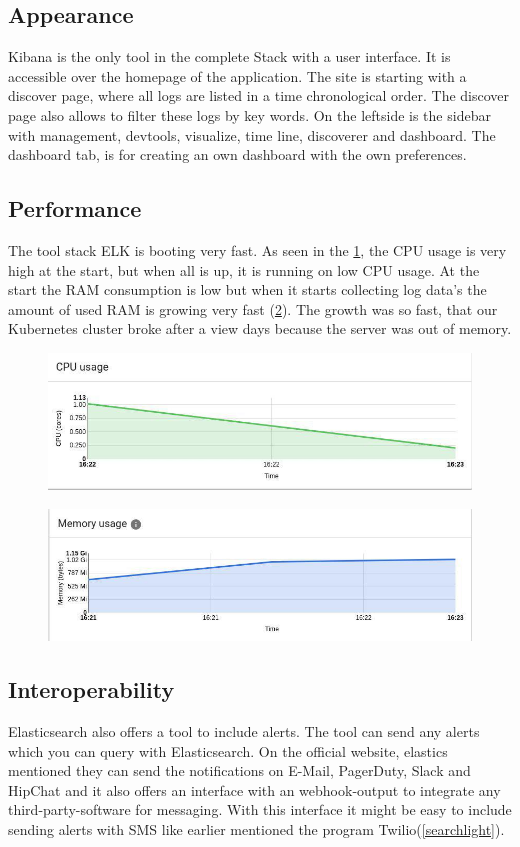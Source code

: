 \subsection{Appearance}%
Kibana is the only tool in the complete Stack with a user interface. It is accessible over the homepage of the application. The site is starting with a discover page, where all logs are listed in a time chronological order. The discover page also allows to filter these logs by key words. On the leftside is the sidebar with management, devtools, visualize, time line, discoverer and dashboard. The dashboard tab, is for creating an own dashboard with the own preferences.
\subsection{Performance}
The tool stack ELK is booting very fast. As seen in the \cref{fig:ELK_CPU}, the CPU usage is very high at the start, but when all is up, it is running on low CPU usage. At the start the RAM consumption is low but when it starts collecting log data's the amount of used RAM is growing very fast (\cref{fig:ELK_MEM}). The growth was so fast, that our Kubernetes cluster broke after a view days because the server was out of memory.
\begin{figure}
	\centering
	\includegraphics[width=0.5\linewidth]{Bilder/Performance/ELK_CPU}
	\caption{}
	\label{fig:ELK_CPU}
\end{figure}
\begin{figure}
	\centering
	\includegraphics[width=0.5\linewidth]{Bilder/Performance/ELK_MEM}
	\caption{}
	\label{fig:ELK_MEM}
\end{figure}
\subsection{Interoperability}
Elasticsearch also offers a tool to include alerts. The tool can send any alerts which you can query with Elasticsearch. On the official website, elastics mentioned they can send the notifications on E-Mail, PagerDuty, Slack and HipChat and it also offers an interface with an webhook-output to integrate any third-party-software for messaging. With this interface it might be easy to include sending alerts with SMS like earlier mentioned the program Twilio(\ref{searchlight}).
